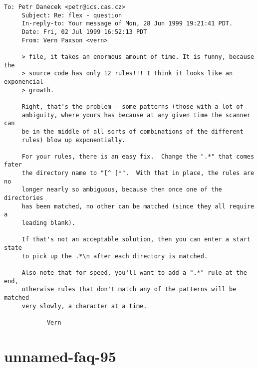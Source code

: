 \documentclass[openany,oneside]{book}
\begin{document}
\begin{verbatim}
To: Petr Danecek <petr@ics.cas.cz>
     Subject: Re: flex - question
     In-reply-to: Your message of Mon, 28 Jun 1999 19:21:41 PDT.
     Date: Fri, 02 Jul 1999 16:52:13 PDT
     From: Vern Paxson <vern>
     
     > file, it takes an enormous amount of time. It is funny, because the
     > source code has only 12 rules!!! I think it looks like an exponencial
     > growth.
     
     Right, that's the problem - some patterns (those with a lot of
     ambiguity, where yours has because at any given time the scanner can
     be in the middle of all sorts of combinations of the different
     rules) blow up exponentially.
     
     For your rules, there is an easy fix.  Change the ".*" that comes fater
     the directory name to "[^ ]*".  With that in place, the rules are no
     longer nearly so ambiguous, because then once one of the directories
     has been matched, no other can be matched (since they all require a
     leading blank).
     
     If that's not an acceptable solution, then you can enter a start state
     to pick up the .*\n after each directory is matched.
     
     Also note that for speed, you'll want to add a ".*" rule at the end,
     otherwise rules that don't match any of the patterns will be matched
     very slowly, a character at a time.
     
     		Vern
\end{verbatim}

\section{unnamed-faq-95}
\end{document}
